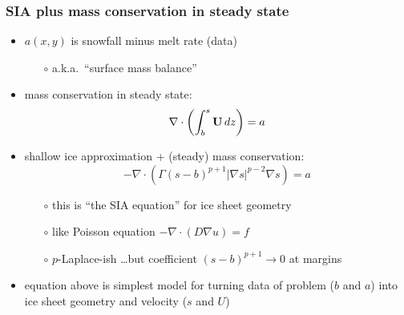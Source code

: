 \documentclass[hide notes,intlimits]{beamer}
\newcommand{\Div}{\nabla\cdot}
\newcommand{\grad}{\nabla}
\begin{document}
\begin{frame}
  \frametitle{SIA plus mass conservation in steady state}

\begin{itemize}
\item $a(x,y)$ is snowfall minus melt rate (data)
  \begin{itemize}
  \item[$\circ$] a.k.a.~``surface mass balance''
  \end{itemize}
\item mass conservation in steady state: 
  $$\Div \left(  \int_b^s {\bf U}\, dz \right)  =  a$$
\item shallow ice approximation + (steady) mass conservation:
  $$-\Div \left(\Gamma (s-b)^{p+1} | \nabla s |^{p-2} \nabla s\right) =  a$$
  \begin{itemize}
  \vspace{-0.2in}
  \item[$\circ$] this is ``the SIA equation'' for ice sheet geometry
  \item[$\circ$] like Poisson equation $-\Div (D \grad u) = f$
  \item[$\circ$] $p$-Laplace-ish \dots but coefficient $(s-b)^{p+1} \to 0$ at margins
  \end{itemize}
\item equation above is simplest model for turning data of problem ($b$ and $a$) into ice sheet geometry and velocity ($s$ and $U$)
\end{itemize}
\end{frame}
\end{document}
